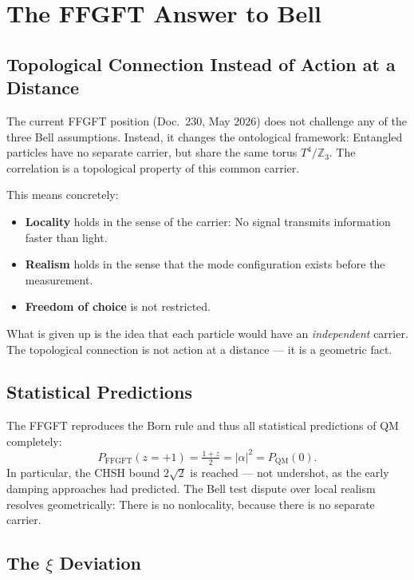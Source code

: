 \chapter{The FFGFT Answer to Bell}
\label{ch:bell_ffgft}

\section{Topological Connection Instead of Action at a Distance}

The current FFGFT position (Doc.~230, May 2026) does not challenge any of the three
Bell assumptions. Instead, it changes the ontological framework:
Entangled particles have no separate carrier, but share
the same torus $T^4/\mathbb{Z}_3$. The correlation is a
topological property of this common carrier.

This means concretely:
\begin{itemize}
  \item \textbf{Locality} holds in the sense of the carrier: No signal
        transmits information faster than light.
  \item \textbf{Realism} holds in the sense that the mode
        configuration exists before the measurement.
  \item \textbf{Freedom of choice} is not restricted.
\end{itemize}
What is given up is the idea that each particle
would have an \emph{independent} carrier. The topological connection
is not action at a distance — it is a geometric fact.

\section{Statistical Predictions}

The FFGFT reproduces the Born rule and thus all statistical
predictions of QM completely:
\begin{equation}
  P_{\mathrm{FFGFT}}(z=+1) = \tfrac{1+z}{2} = |\alpha|^2 = P_{\mathrm{QM}}(0).
\end{equation}
In particular, the CHSH bound $2\sqrt2$ is reached — not
undershot, as the early damping approaches had predicted. The Bell test dispute over local realism
resolves geometrically: There is no nonlocality, because there is no
separate carrier.

\section{The $\xi$ Deviation}

